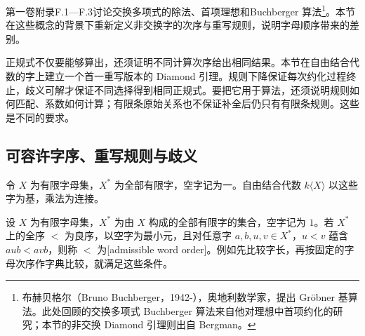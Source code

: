 
%
%


第一卷附录F.1—F.3讨论交换多项式的除法、首项理想和Buchberger 算法\footnote{布赫贝格尔（Bruno Buchberger，1942-），奥地利数学家，提出 Gröbner 基算法。此处回顾的交换多项式 Buchberger 算法来自他对理想中首项约化的研究；本节的非交换 Diamond 引理则出自 Bergman。}。本节在这些概念的背景下重新定义非交换字的次序与重写规则，说明字母顺序带来的差别。

\ProseParagraphBreak
正规式不仅要能够算出，还须证明不同计算次序给出相同结果。本节在自由结合代数的字上建立一个首一重写版本的 Diamond 引理。规则下降保证每次约化过程终止，歧义可解才保证不同选择得到相同正规式。要把它用于算法，还须说明规则如何匹配、系数如何计算；有限条原始关系也不保证补全后仍只有有限条规则。这些是不同的要求。


\subsection{可容许字序、重写规则与歧义}
\label{b2:subsec:2006:01}

令 \(X\) 为有限字母集，\(X^*\) 为全部有限字，空字记为一。自由结合代数 \(k\langle X\rangle\) 以这些字为基，乘法为连接。

\begin{definition}\label{b2:def:admissible-word-order}
	设 \(X\) 为有限字母集，\(X^*\) 为由 \(X\) 构成的全部有限字的集合，空字记为 \(1\)。若 \(X^*\) 上的全序 \(<\) 为良序，以空字为最小元，且对任意字 \(a,b,u,v\in X^*\)，\(u<v\) 蕴含 \(aub<avb\)，则称 \(<\) 为[admissible word order]。例如先比较字长，再按固定的字母次序作字典比较，就满足这些条件。
\end{definition}

